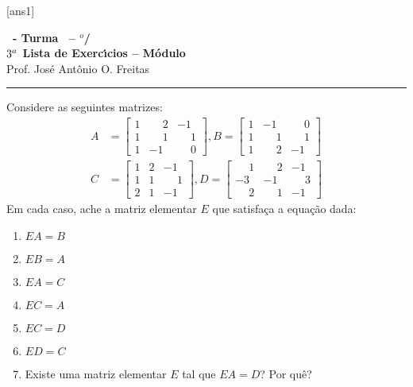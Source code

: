 \documentclass[12pt]{exam}
\begin{document}
  [ans1]
  \begin{center}
    {\Large\bf \disciplina\ - Turma \turma\ -- \semestre$^{o}$/\ano} \\ \vspace{9pt} {\large\bf
        $3^a$ Lista de Exerc{\'\i}cios -- Módulo \numeromodulo}\\ \vspace{9pt} Prof. Jos{\'e} Ant{\^o}nio O. Freitas
  \end{center}
  \hrule


\begin{exercicio}
  Considere as seguintes matrizes:
  \begin{align*}
    A &= \begin{bmatrix}1 & \phantom{-}2 & -1\\1 & \phantom{-} 1 & \phantom{-} 1\\1 & -1 & \phantom{-} 0\end{bmatrix},
    B = \begin{bmatrix}1 & -1 & \phantom{-} 0\\1 & \phantom{-} 1 & \phantom{-} 1\\1 & \phantom{-} 2 & -1\end{bmatrix}\\
    C &= \begin{bmatrix}1 & 2 & -1\\1 & 1 & \phantom{-} 1\\2 & 1 & -1\end{bmatrix},
    D = \begin{bmatrix}\phantom{-} 1 & \phantom{-} 2 & -1\\-3 & -1 & \phantom{-} 3\\\phantom{-} 2 & \phantom{-} 1 & -1\end{bmatrix}
  \end{align*}
  Em cada caso, ache a matriz elementar $E$ que satisfaça a equação dada:
  \begin{multicols}{3}
    \begin{enumerate}[label={\alph*})]
      \item $EA = B$
      \item $EB = A$
      \item $EA = C$
      \item $EC = A$
      \item $EC = D$
      \item $ED = C$
      \item Existe uma matriz elementar $E$ tal que $EA = D$? Por quê?

\end{enumerate}
\end{multicols}
\end{exercicio}
\end{document}
